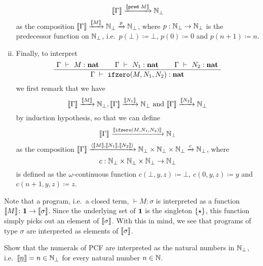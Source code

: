 \begin{definition}
\begin{enumerate}[(i)]
    \[
      \llbracket\Gamma\rrbracket \xrightarrow{\llbracket\operatorname{\mathtt{pred}}\,M\rrbracket} \mathbb N_\bot
    \]
    as the composition
    \(\llbracket\Gamma\rrbracket \xrightarrow{\llbracket M\rrbracket} \mathbb N_\bot \xrightarrow{p}
    \mathbb N_\bot\), where \(p : \mathbb N_\bot \to \mathbb N_\bot\) is the predecessor
    function on \(\mathbb N_\bot\), i.e.\ \(p(\bot) \coloneqq \bot\),
    \(p(0) \coloneqq 0\) and \(p(n+1) \coloneqq n\).
  \item\label{def:interpretation-ifzero}
    Finally, to interpret
    \[
      \def\fCenter{\ \vdash\ }
      \Axiom$\Gamma \fCenter M : \pcfnat$
      \Axiom$\Gamma \fCenter N_1 : \pcfnat$
      \Axiom$\Gamma \fCenter N_2 : \pcfnat$
      \TrinaryInf$\Gamma \fCenter \pcfifz(M,N_1,N_2) : \pcfnat$
      \DisplayProof
    \]
    we first remark that we have
    \[
      \llbracket\Gamma\rrbracket \xrightarrow{\llbracket M\rrbracket} \mathbb N_\bot,
      \llbracket\Gamma\rrbracket \xrightarrow{\llbracket N_1\rrbracket} \mathbb N_\bot \text{ and }
      \llbracket\Gamma\rrbracket \xrightarrow{\llbracket N_2\rrbracket} \mathbb N_\bot
    \]
    by induction hypothesis, so that we can define
    \[
      \llbracket\Gamma\rrbracket \xrightarrow{\llbracket\operatorname{\mathtt{ifzero}}(M,N_1,N_2)\rrbracket} \mathbb N_\bot
    \]
    as the composition
    \(\llbracket\Gamma\rrbracket
    \xrightarrow{\langle{\llbracket M\rrbracket,\llbracket N_1\rrbracket,\llbracket N_2\rrbracket}\rangle}
    {{\mathbb N_\bot} \times {\mathbb N_\bot} \times {\mathbb N_\bot}} \xrightarrow{c}
    \mathbb N_\bot\), where
    \[
      c : \mathbb N_\bot \times \mathbb N_\bot \times \mathbb N_\bot \to \mathbb N_\bot
    \] is defined as the \(\omega\)-continuous function
    \(c(\bot,y,z) \coloneqq \bot\), \(c(0,y,z) \coloneqq y\) and
    \(c(n+1,y,z) \coloneqq z\).
  \end{enumerate}
\end{definition}

\begin{remark}
  Note that a program, i.e.\ a closed term, \({} \vdash M : \sigma\) is
  interpreted as a function
  \(\llbracket M\rrbracket \colon \mathbf 1 \to \llbracket\sigma\rrbracket\).
  Since the underlying set of \(\mathbf 1\) is the singleton \(\{\star\}\), this
  function simply picks out an element of \(\llbracket\sigma\rrbracket\).
  With this in mind, we see that programs of type \(\sigma\) are interpreted
  as elements of \(\llbracket\sigma\rrbracket\).
\end{remark}


\begin{exercise}\label{exer:interpretation-of-numerals}
  Show that the numerals of PCF are interpreted as the natural numbers in
  \(\mathbb N_\bot\), i.e.\ \(\llbracket\underline{n}\rrbracket = n \in \mathbb N_\bot\) for every
  natural number \(n \in \mathbb N\).
\end{exercise}

